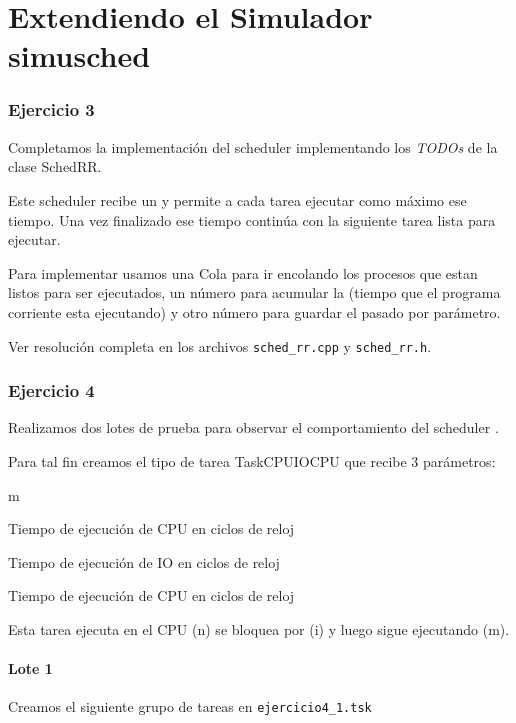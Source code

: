 


\part{Extendiendo el Simulador simusched}

\section{Ejercicio 3}

Completamos la implementaci\'on del scheduler \rr implementando los \textit{TODOs} de la clase SchedRR.

Este scheduler recibe un \quantum y permite a cada tarea ejecutar como m\'aximo ese tiempo. Una vez finalizado ese tiempo contin\'ua con la siguiente tarea lista para ejecutar.

Para implementar \rr usamos una Cola para ir encolando los procesos que estan listos para ser ejecutados, un n\'umero para acumular la \quota (tiempo que el programa corriente esta ejecutando) y otro n\'umero para guardar el \quantum pasado por par\'ametro.

Ver resoluci\'on completa en los archivos \verb|sched_rr.cpp| y \verb|sched_rr.h|.

\section{Ejercicio 4}

Realizamos dos lotes de prueba para observar el comportamiento del scheduler \rr. 

Para tal fin creamos el tipo de tarea TaskCPUIOCPU que recibe 3 par\'ametros:

\begin{mydescription}{m}
 \item[n] Tiempo de ejecuci\'on de CPU en ciclos de reloj
 \item[i] Tiempo de ejecuci\'on de IO en ciclos de reloj
 \item[m] Tiempo de ejecuci\'on de CPU en ciclos de reloj
\end{mydescription}

Esta tarea ejecuta en el CPU (n) se bloquea por (i) y luego sigue ejecutando (m).

\subsection{Lote 1}

Creamos el siguiente grupo de tareas en \verb|ejercicio4_1.tsk|

